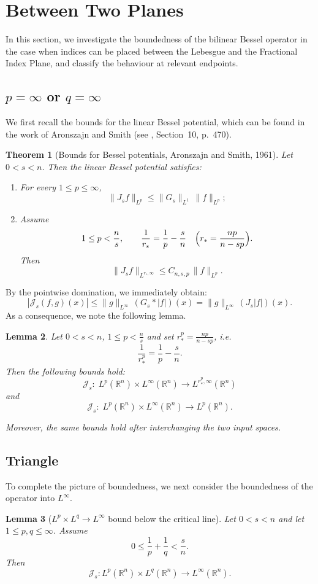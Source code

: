\documentclass[12pt]{article}
\newtheorem{theorem}{Theorem}[section]
\newtheorem{lemma}[theorem]{Lemma}
\theoremstyle{definition}
\theoremstyle{remark}
\numberwithin{equation}{section}
\begin{document}
\section{Between Two Planes}

In this section, we investigate the boundedness of the bilinear Bessel operator in the case when indices can be placed between the Lebesgue and the Fractional Index Plane, and classify the behaviour at relevant endpoints. 
\subsection{$p=\infty$ or $q=\infty$}
We first recall the bounds for the linear Bessel potential, which can be found in the work of Aronszajn and Smith (see \cite{AroSmi}, Section~10, p.~470).
\begin{theorem}[Bounds for Bessel potentials, Aronszajn and Smith, 1961]
Let $0<s<n$. Then the linear Bessel potential satisfies:
\begin{enumerate}
    \item For every $1\le p\le\infty$,
\[
\|J_s f\|_{L^p}
\le
\|G_s\|_{L^1}\,\|f\|_{L^p};
\]
\item Assume
\[
1\le p<\frac{n}{s},
\qquad
\frac1{r_*}=\frac1p-\frac{s}{n}
\quad
\Bigl(r_*=\frac{np}{n-sp}\Bigr).
\]
Then
\[
\|J_s f\|_{L^{r_*,\infty}}
\le
C_{n,s,p}\,\|f\|_{L^p}.
\]
\end{enumerate}
\end{theorem}



By the pointwise domination, we immediately obtain:
\[
|\mathcal{J}_s(f,g)(x)|
\le \|g\|_{L^\infty}\,(G_s*|f|)(x)
=\|g\|_{L^\infty}\,(J_s|f|)(x). 
\]
As a consequence, we note the following lemma.

\begin{lemma}
\label{lem:LPLINFTY}
Let $0<s<n$, $1\le p<\frac{n}{s}$ and set $r^p_*=\frac{np}{n-sp}$, i.e.
\[
\frac1{r^p_*}=\frac1p-\frac{s}{n}.
\]
Then the following bounds hold:
\[
\mathcal J_s:\; L^p(\mathbb R^n)\times L^\infty(\mathbb R^n)\to L^{r^p_*,\infty}(\mathbb R^n)
\]
 and
\[
\mathcal J_s:\; L^p(\mathbb R^n)\times L^\infty(\mathbb R^n)\to L^p(\mathbb R^n).
\]

Moreover, the same bounds hold after interchanging the two input spaces.
\end{lemma}



\subsection{Triangle}
To complete the picture of boundedness, we next consider the boundedness of the operator into $L^\infty.$
\begin{lemma}[$L^p\times L^q\to L^\infty$ bound below the critical line]
\label{lem:Js_LpLq_Linfty}
Let $0<s<n$ and let $1\le p,q\le \infty$. Assume
\begin{equation}\label{eq:subcritical-Linfty}
0\le \frac1p+\frac1q<\frac{s}{n}.
\end{equation}
Then
\[
\mathcal J_s:
L^p(\mathbb R^n)\times L^q(\mathbb R^n)
\longrightarrow
L^\infty(\mathbb R^n).
\]
\end{lemma}
\end{document}

